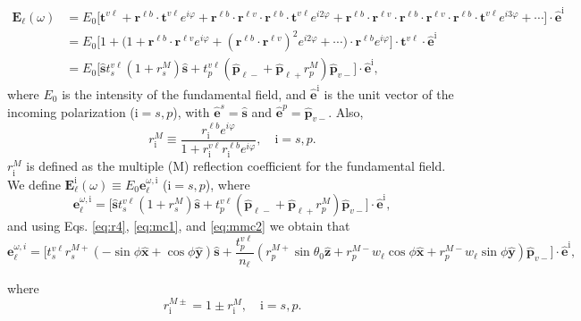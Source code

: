\documentclass[aps,pra,10pt,amsmath,twocolumn,letterpaper]{revtex4-1}
\begin{document}
\begin{widetext}
\begin{equation*}\label{eq:mcvew}
\begin{split}
\mathbf{E}_{\ell}(\omega)
&= E_{0}
\Big[
\mathbf{t}^{v\ell} + \mathbf{r}^{\ell b}\cdot\mathbf{t}^{v\ell}e^{i\varphi}
 + \mathbf{r}^{\ell b}\cdot\mathbf{r}^{\ell v}\cdot
   \mathbf{r}^{\ell b}\cdot\mathbf{t}^{v\ell} e^{i2\varphi}
 + \mathbf{r}^{\ell b}\cdot\mathbf{r}^{\ell v}\cdot
   \mathbf{r}^{\ell b}\cdot\mathbf{r}^{\ell v}\cdot
   \mathbf{r}^{\ell b}\cdot\mathbf{t}^{v\ell} e^{i3\varphi}
 + \cdots
\Big]\cdot\hat{\mathbf{e}}^{\mathrm{i}}\nonumber\\
&= E_{0}
\Big[
1 + \Big(1 + \mathbf{r}^{\ell b}\cdot\mathbf{r}^{\ell v}e^{i\varphi}
+ (\mathbf{r}^{\ell b}\cdot\mathbf{r}^{\ell v})^2e^{i2\varphi}+\cdots\Big)\cdot
\mathbf{r}^{\ell b}e^{i\varphi}
\Big]
\cdot\mathbf{t}^{v\ell}\cdot\hat{\mathbf{e}}^{\mathrm{i}}\nonumber\\
&= E_{0}
\Big[
\hat{\mathbf{s}} t^{v\ell}_{s}(1+r^{M}_{s})\hat{\mathbf{s}} 
+ t^{v\ell}_{p}
\left(\hat{\mathbf{p}}_{\ell-}+\hat{\mathbf{p}}_{\ell+}r^{M}_{p}\right)
\hat{\mathbf{p}}_{v-}
\Big]\cdot\hat{\mathbf{e}}^{\mathrm{i}},
\end{split}
\end{equation*}
where $E_{0}$ is the intensity of the fundamental field, and
$\hat{\mathbf{e}}^{\mathrm{i}}$ is the unit vector of the incoming polarization
($\mathrm{i} = s,p$), with $\hat{\mathbf{e}}^{s}=\hat{\mathbf{s}}$ and
$\hat{\mathbf{e}}^{p}=\hat{\mathbf{p}}_{v-}$. Also,
\begin{equation}\label{mvrm}
r^{M}_{\mathrm{i}} \equiv
\frac{r^{\ell b}_{\mathrm{i}}e^{i\varphi}}{1+r^{v\ell}_{\mathrm{i}}
r^{\ell b}_{\mathrm{i}}e^{i\varphi}}, \quad \mathrm{i}=s,p.
\end{equation}
$r^{M}_{\mathrm{i}}$ is defined as the multiple (M) reflection coefficient for
the fundamental field. We define $\mathbf{E}^{\mathrm{i}}_{\ell}(\omega)\equiv
E_{0}\mathbf{e}^{\omega,\mathrm{i}}_{\ell}$ ($\mathrm{i}=s,p$), where
\begin{equation*}\label{eq:mcvew2}
\mathbf{e}^{\omega,\mathrm{i}}_\ell 
= \Big[\hat{\mathbf{s}} t^{v\ell}_s(1+r^M_s)\hat{\mathbf{s}} 
+ t^{v\ell}_p\left(\hat{\mathbf{p}}_{\ell-}+\hat{\mathbf{p}}_{\ell+}r^{M}_p 
\right)\hat{\mathbf{p}}_{v-}
\Big]\cdot\hat{\mathbf{e}}^{\mathrm{i}},
\end{equation*}
and using Eqs. \eqref{eq:r4}, \eqref{eq:mc1}, and \eqref{eq:mmc2} we obtain that
\begin{equation}\label{eq:vec1wcomplete}
\mathbf{e}^{\omega,i}_{\ell}
=
\Bigg[
t^{v\ell}_{s} r^{M+}_{s}
\left(- \sin\phi\hat{\mathbf{x}} + \cos\phi\hat{\mathbf{y}}\right)
\hat{\mathbf{s}}
+
\frac{t^{v\ell}_{p}}{n_{\ell}}
\left( 
  r^{M+}_{p}\sin\theta_{0}\hat{\mathbf{z}}
+ r^{M-}_{p}w_{\ell}\cos\phi\hat{\mathbf{x}}
+ r^{M-}_{p}w_{\ell}\sin\phi\hat{\mathbf{y}}
\right)
\hat{\mathbf{p}}_{v-}
\Bigg]
\cdot \hat{\mathbf{e}}^{\mathrm{i}},
\end{equation} 
\end{widetext}
where
\begin{equation*}\label{eq:mvc}
r^{M\pm}_{\mathrm{i}}=1\pm r^{M}_{\mathrm{i}},\quad \mathrm{i} = s,p.
\end{equation*}
\end{document}
